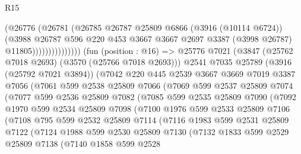 \begin{lexlean}{R15}
\begin{coremodule}
                          (@26776
                            (@26781
                              (@26785
                                @26787
                                @25809
                                @6866
                                (@3916 (@10114 @6724))
                                (@3988
                                  @26787
                                  @596
                                  @220
                                  @453
                                  @3667
                                  @3667
                                  @2697
                                  @3387
                                  (@3998 @26787)
                                  @11805)))))))))))))))
    (fun (position : @16) =>
    @25776
      @7021
      (@3847 (@25762 @7018 @2693) (@3570 (@25766 @7018 @2693)))
      @2541
      @7035
      @25789
      (@3916 (@25792 @7021 @3894))
      (@7042
        @220
        @445
        @2539
        @3667
        @3669
        @7019
        @3387
        @7056
        (@7061
          @599
          @2538
          @25809
          @7066
          (@7069
            @599
            @2537
            @25809
            @7074
            (@7077
              @599
              @2536
              @25809
              @7082
              (@7085
                @599
                @2535
                @25809
                @7090
                (@7092
                  @1970
                  @599
                  @2534
                  @25809
                  @7098
                  (@7100
                    @1976
                    @599
                    @2533
                    @25809
                    @7106
                    (@7108
                      @795
                      @599
                      @2532
                      @25809
                      @7114
                      (@7116
                        @1983
                        @599
                        @2531
                        @25809
                        @7122
                        (@7124
                          @1988
                          @599
                          @2530
                          @25809
                          @7130
                          (@7132
                            @1833
                            @599
                            @2529
                            @25809
                            @7138
                            (@7140
                              @1858
                              @599
                              @2528

\end{coremodule}
\end{lexlean}
